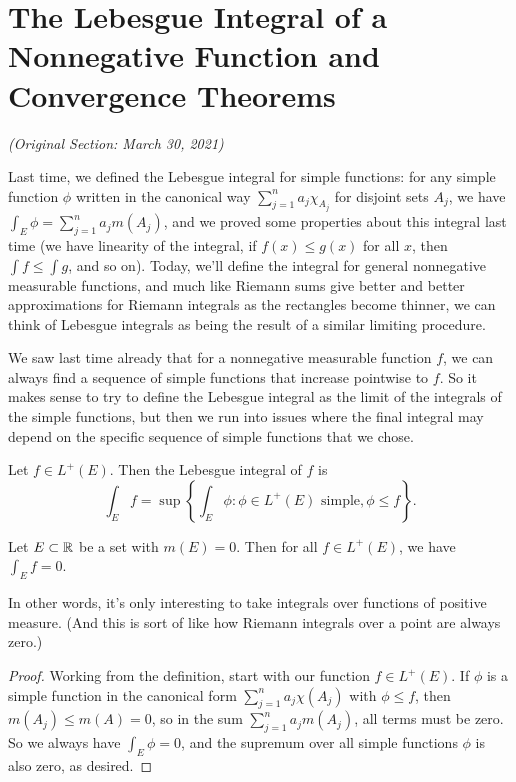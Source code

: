 \pagebreak\section{The Lebesgue Integral of a Nonnegative Function and Convergence Theorems}

\textit{(Original Section: March 30, 2021)}

Last time, we defined the Lebesgue integral for simple functions: for any simple function $\phi$ written in the canonical way $\sum_{j=1}^n a_j \chi_{A_j}$ for disjoint sets $A_j$, we have $\int_E \phi = \sum_{j=1}^n a_j m(A_j)$, and we proved some properties about this integral last time (we have linearity of the integral, if $f(x) \le g(x)$ for all $x$, then $\int f \le \int g$, and so on). Today, we'll define the integral for general nonnegative measurable functions, and much like Riemann sums give better and better approximations for Riemann integrals as the rectangles become thinner, we can think of Lebesgue integrals as being the result of a similar limiting procedure.

We saw last time already that for a nonnegative measurable function $f$, we can always find a sequence of simple functions that increase pointwise to $f$. So it makes sense to try to define the Lebesgue integral as the limit of the integrals of the simple functions, but then we run into issues where the final integral may depend on the specific sequence of simple functions that we chose.

\begin{definition}
Let $f \in L^+(E)$. Then the Lebesgue integral of $f$ is
\[
    \int_E f = \sup\left\{\int_E \phi: \phi \in L^+(E) \text{ simple}, \phi \le f\right\}.
\]
\end{definition}

\begin{proposition}\label{lebesgdefn1}
Let $E \subset \mathbb R$ be a set with $m(E) = 0$. Then for all $f \in L^+(E)$, we have $\int_E f = 0$.
\end{proposition}

In other words, it's only interesting to take integrals over functions of positive measure. (And this is sort of like how Riemann integrals over a point are always zero.)

\begin{proof}
Working from the definition, start with our function $f \in L^+(E)$. If $\phi$ is a simple function in the canonical form $\sum_{j=1}^n a_j \chi(A_j)$ with $\phi \le f$, then $m(A_j) \le m(A) = 0$, so in the sum $\sum_{j=1}^n a_j m(A_j)$, all terms must be zero. So we always have $\int_E \phi = 0$, and the supremum over all simple functions $\phi$ is also zero, as desired.
\end{proof}


